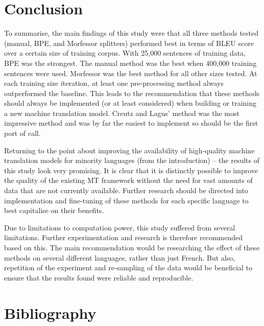 \documentclass[11pt]{article}
\begin{document}
\newpage

\section{Conclusion}

To summarise, the main findings of this study were that all three methods tested (manual, BPE, and Morfessor splitters) performed best in terms of BLEU score over a certain size of training corpus. With 25,000 sentences of training data, BPE was the strongest. The manual method was the best when 400,000 training sentences were used. Morfessor was the best method for all other sizes tested. At each training size iteration, at least one pre-processing method always outperformed the baseline. This leads to the recommendation that these methods should always be implemented (or at least considered) when building or training a new machine translation model. Creutz and Lagus' \citeyearpar{creutz-lagus-2002-unsupervised} method was the most impressive method and was by far the easiest to implement so should be the first port of call.

\bigskip

Returning to the point about improving the availability of high-quality machine translation models for minority languages (from the introduction) -- the results of this study look very promising. It is clear that it is distinctly possible to improve the quality of the existing MT framework without the need for vast amounts of data that are not currently available. Further research should be directed into implementation and fine-tuning of these methods for each specific language to best capitalise on their benefits.

\bigskip

Due to limitations to computation power, this study suffered from several limitations. Further experimentation and research is therefore recommended based on this. The main recommendation would be researching the effect of these methods on several different languages, rather than just French. But also, repetition of the experiment and re-sampling of the data would be beneficial to ensure that the results found were reliable and reproducible.

\newpage

\section{Bibliography}


\end{document}
